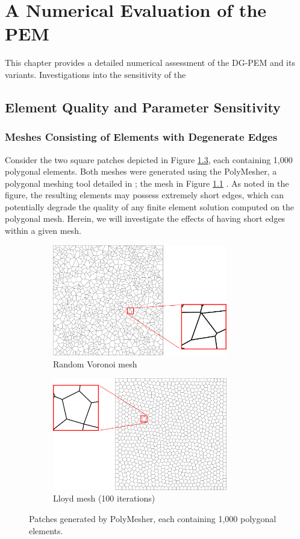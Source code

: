 \chapter{A Numerical Evaluation of the PEM} \label{ch:results}
%
This chapter provides a detailed numerical assessment of the DG-PEM and its variants. Investigations into the sensitivity of the 

\section{Element Quality and Parameter Sensitivity}

\subsection{Meshes Consisting of Elements with Degenerate Edges}

Consider the two square patches depicted in Figure \ref{fig:polygonal_patches}, each containing 1,000 polygonal elements. Both meshes were generated using the PolyMesher, a polygonal meshing tool detailed in \cite{Talischi:12}; the mesh in Figure \ref{fig:patch_mesh} . As noted in the figure, the resulting elements may possess extremely short edges, which can potentially degrade the quality of any finite element solution computed on the polygonal mesh. Herein, we will investigate the effects of having short edges within a given mesh.
\begin{figure}[!h]
    \centering
    \begin{subfigure}[b]{0.49\linewidth}
            \centering
            \includegraphics[width=3.0in]{figures/patch_mesh.pdf}
    			\caption{Random Voronoi mesh \label{fig:patch_mesh}}
    \end{subfigure}
	\begin{subfigure}[b]{0.49\linewidth}
            \centering
            \includegraphics[width=3.0in]{figures/lloyd_mesh.pdf}
    			\caption{Lloyd mesh (100 iterations) \label{fig:lloyd_mesh}}
    \end{subfigure}
    \caption{Patches generated by PolyMesher, each containing 1,000 polygonal elements.}
    \label{fig:polygonal_patches}
\end{figure}

